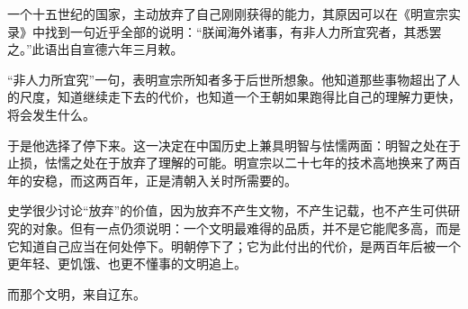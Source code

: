 一个十五世纪的国家，主动放弃了自己刚刚获得的能力，其原因可以在《明宣宗实录》中找到一句近乎全部的说明：“朕闻海外诸事，有非人力所宜究者，其悉罢之。”此语出自宣德六年三月敕。

“非人力所宜究”一句，表明宣宗所知者多于后世所想象。他知道那些事物超出了人的尺度，知道继续走下去的代价，也知道一个王朝如果跑得比自己的理解力更快，将会发生什么。

于是他选择了停下来。这一决定在中国历史上兼具明智与怯懦两面：明智之处在于止损，怯懦之处在于放弃了理解的可能。明宣宗以二十七年的技术高地换来了两百年的安稳，而这两百年，正是清朝入关时所需要的。

史学很少讨论“放弃”的价值，因为放弃不产生文物，不产生记载，也不产生可供研究的对象。但有一点仍须说明：一个文明最难得的品质，并不是它能爬多高，而是它知道自己应当在何处停下。明朝停下了；它为此付出的代价，是两百年后被一个更年轻、更饥饿、也更不懂事的文明追上。

而那个文明，来自辽东。

